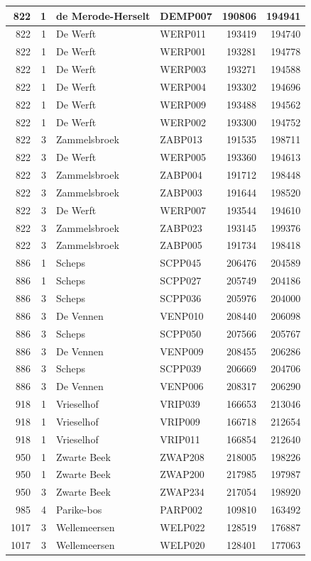 \documentclass[11pt,]{book}
\begin{document}
\begin{table}
\begin{tabular}[t]{r|r|l|l|r|r}
\hline
822 & 1 & de Merode-Herselt & DEMP007 & 190806 & 194941\\
\hline
822 & 1 & De Werft & WERP011 & 193419 & 194740\\
\hline
822 & 1 & De Werft & WERP001 & 193281 & 194778\\
\hline
822 & 1 & De Werft & WERP003 & 193271 & 194588\\
\hline
822 & 1 & De Werft & WERP004 & 193302 & 194696\\
\hline
822 & 1 & De Werft & WERP009 & 193488 & 194562\\
\hline
822 & 1 & De Werft & WERP002 & 193300 & 194752\\
\hline
822 & 3 & Zammelsbroek & ZABP013 & 191535 & 198711\\
\hline
822 & 3 & De Werft & WERP005 & 193360 & 194613\\
\hline
822 & 3 & Zammelsbroek & ZABP004 & 191712 & 198448\\
\hline
822 & 3 & Zammelsbroek & ZABP003 & 191644 & 198520\\
\hline
822 & 3 & De Werft & WERP007 & 193544 & 194610\\
\hline
822 & 3 & Zammelsbroek & ZABP023 & 193145 & 199376\\
\hline
822 & 3 & Zammelsbroek & ZABP005 & 191734 & 198418\\
\hline
886 & 1 & Scheps & SCPP045 & 206476 & 204589\\
\hline
886 & 1 & Scheps & SCPP027 & 205749 & 204186\\
\hline
886 & 3 & Scheps & SCPP036 & 205976 & 204000\\
\hline
886 & 3 & De Vennen & VENP010 & 208440 & 206098\\
\hline
886 & 3 & Scheps & SCPP050 & 207566 & 205767\\
\hline
886 & 3 & De Vennen & VENP009 & 208455 & 206286\\
\hline
886 & 3 & Scheps & SCPP039 & 206669 & 204706\\
\hline
886 & 3 & De Vennen & VENP006 & 208317 & 206290\\
\hline
918 & 1 & Vrieselhof & VRIP039 & 166653 & 213046\\
\hline
918 & 1 & Vrieselhof & VRIP009 & 166718 & 212654\\
\hline
918 & 1 & Vrieselhof & VRIP011 & 166854 & 212640\\
\hline
950 & 1 & Zwarte Beek & ZWAP208 & 218005 & 198226\\
\hline
950 & 1 & Zwarte Beek & ZWAP200 & 217985 & 197987\\
\hline
950 & 3 & Zwarte Beek & ZWAP234 & 217054 & 198920\\
\hline
985 & 4 & Parike-bos & PARP002 & 109810 & 163492\\
\hline
1017 & 3 & Wellemeersen & WELP022 & 128519 & 176887\\
\hline
1017 & 3 & Wellemeersen & WELP020 & 128401 & 177063\\
\hline
\end{tabular}
\end{table}
\end{document}

